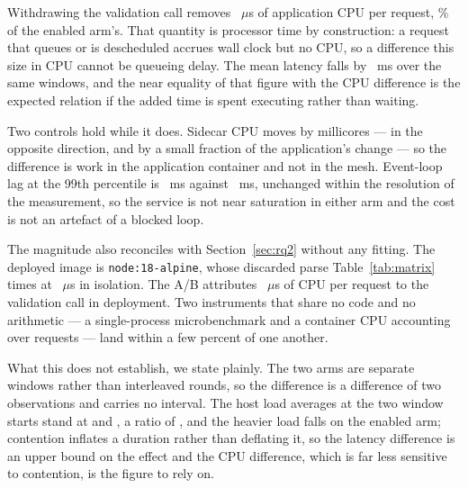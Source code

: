 Withdrawing the validation call removes \ABDeltaCpuUs~$\mu$s of application CPU
per request, \ABDeltaCpuPct\% of the enabled arm's. That quantity is processor
time by construction: a request that queues or is descheduled accrues wall clock
but no CPU, so a difference this size in CPU cannot be queueing delay. The mean
latency falls by \ABDeltaWall~ms over the same windows, and the near equality of
that figure with the CPU difference is the expected relation if the added time
is spent executing rather than waiting.

Two controls hold while it does. Sidecar CPU moves by
\ABDeltaSideMc{} millicores --- in the opposite direction, and by a small
fraction of the application's change --- so the difference is work in the
application container and not in the mesh. Event-loop lag at the 99th percentile
is \ABEnabledLoopLag~ms against \ABDisabledLoopLag~ms, unchanged within the
resolution of the measurement, so the service is not near saturation in either
arm and the cost is not an artefact of a blocked loop.

The magnitude also reconciles with Section~\ref{sec:rq2} without any fitting.
The deployed image is \texttt{node:18-alpine}, whose discarded parse
Table~\ref{tab:matrix} times at \NodeEighteenProbeThrows~$\mu$s in isolation.
The A/B attributes \ABDeltaCpuUs~$\mu$s of CPU per request to the validation
call in deployment. Two instruments that share no code and no arithmetic ---
a single-process microbenchmark and a container CPU accounting over
\ABReqs{} requests --- land within a few percent of one another.

What this does not establish, we state plainly. The two arms are separate
windows rather than interleaved rounds, so the difference is a difference of two
observations and carries no interval. The host load averages at the two window
starts stand at \ABEnabledLoad{} and \ABDisabledLoad, a ratio of
\ABLoadRatio, and the heavier load falls on the enabled arm; contention inflates
a duration rather than deflating it, so the latency difference is an upper bound
on the effect and the CPU difference, which is far less sensitive to contention,
is the figure to rely on.
